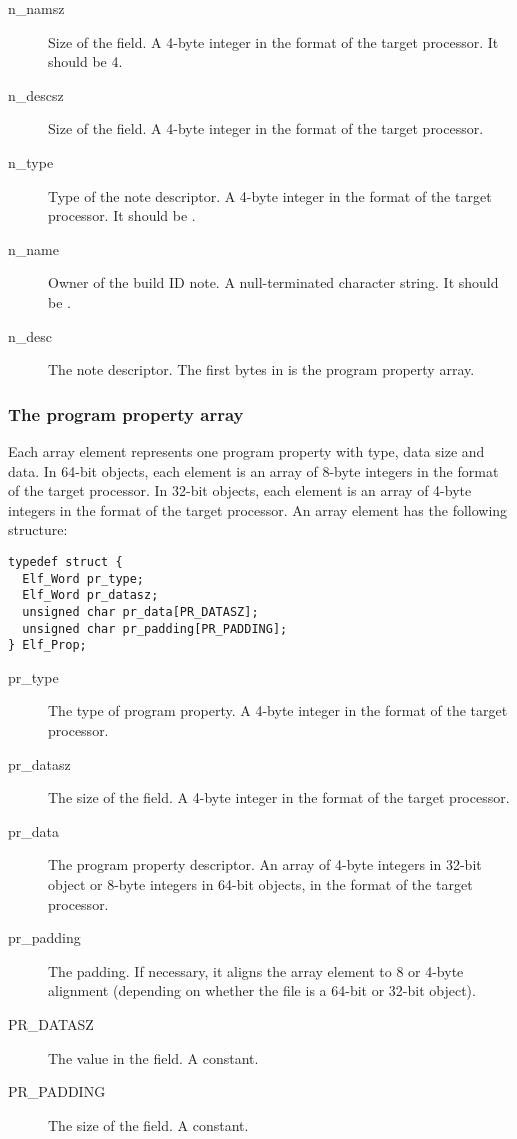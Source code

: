 \begin{description}
 \item[n_namsz] Size of the  field.  A 4-byte integer in the
   format of the target processor.  It should be 4.
 \item[n_descsz] Size of the  field.  A 4-byte integer in the
   format of the target processor.
 \item[n_type] Type of the note descriptor.  A 4-byte integer in the format
   of the target processor.  It should be .
 \item[n_name] Owner of the build ID note.  A null-terminated character
   string.  It should be .
 \item[n_desc] The note descriptor.  The first  bytes in
    is the program property array.
\end{description}

\subsubsection{The program property array}

Each array element represents one program property with type, data size
and data.  In 64-bit objects, each element is an array of 8-byte integers
in the format of the target processor.  In 32-bit objects, each element
is an array of 4-byte integers in the format of the target processor.
An array element has the following structure:

\begin{verbatim}
typedef struct {
  Elf_Word pr_type;
  Elf_Word pr_datasz;
  unsigned char pr_data[PR_DATASZ];
  unsigned char pr_padding[PR_PADDING];
} Elf_Prop;
\end{verbatim}

\begin{description}
 \item[pr_type] The type of program property.  A 4-byte integer in the
   format of the target processor.
 \item[pr_datasz] The size of the  field.  A 4-byte
   integer in the format of the target processor.
 \item[pr_data] The program property descriptor.  An array of 4-byte
   integers in 32-bit object or 8-byte integers in 64-bit objects, in
   the format of the target processor.
 \item[pr_padding] The padding.  If necessary, it aligns the array
   element to 8 or 4-byte alignment (depending on whether the file is
   a 64-bit or 32-bit object).
 \item[PR_DATASZ] The value in the  field.  A constant.
 \item[PR_PADDING] The size of the  field.  A constant.
\end{description}

